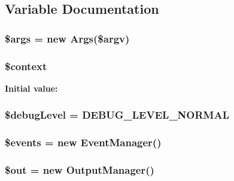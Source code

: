 \subsection{Variable Documentation}
\hypertarget{setup_8php_a67e94494731d99ed23b123e95175bc10}{
\subsubsection[{\$args}]{\setlength{\rightskip}{0pt plus 5cm}\$args = new Args(\$argv)}}\label{setup_8php_a67e94494731d99ed23b123e95175bc10}
\hypertarget{setup_8php_ae05dedb802ada0155efdece2044fed64}{
\subsubsection[{\$context}]{\setlength{\rightskip}{0pt plus 5cm}\$context}}\label{setup_8php_ae05dedb802ada0155efdece2044fed64}
{\bfseries Initial value\-:}
\hypertarget{setup_8php_a8907cc6f1fc6ed47ef25190cb8310f41}{
\subsubsection[{\$debug\-Level}]{\setlength{\rightskip}{0pt plus 5cm}\$debug\-Level = {\bf D\-E\-B\-U\-G\-\_\-\-L\-E\-V\-E\-L\-\_\-\-N\-O\-R\-M\-A\-L}}}\label{setup_8php_a8907cc6f1fc6ed47ef25190cb8310f41}
\hypertarget{setup_8php_a1bcec9bbd34255927faaf155bf3a940a}{
\subsubsection[{\$events}]{\setlength{\rightskip}{0pt plus 5cm}\$events = new Event\-Manager()}}\label{setup_8php_a1bcec9bbd34255927faaf155bf3a940a}
\hypertarget{setup_8php_a48cb304902320d173a4eaa41543327b9}{
\subsubsection[{\$out}]{\setlength{\rightskip}{0pt plus 5cm}\$out = new Output\-Manager()}}\label{setup_8php_a48cb304902320d173a4eaa41543327b9}
